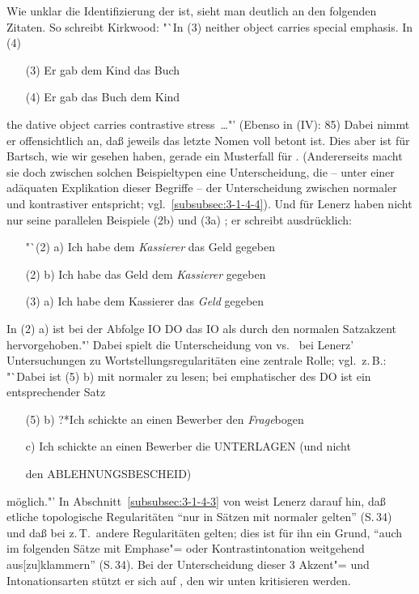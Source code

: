 \documentclass[output=paper]{langsci/langscibook}
\begin{document}
Wie unklar die Identifizierung der  ist, sieht
man deutlich an den folgenden Zitaten. So schreibt Kirkwood:
\ea \label{ex:3-4}
"`In (3) neither object carries special emphasis. In (4)
\begin{enumerate}
\setlength{\itemindent}{2em}
\item[(3)] Er gab dem Kind das Buch
\item[(4)] Er gab das Buch dem Kind
\end{enumerate}
the dative object carries contrastive stress\ \ldots{}"' \citep[86]{Kirkwood69}
\z
(Ebenso \zb in \citealt{Griesbach1961a} (IV): 85) Dabei nimmt er offensichtlich an, daß jeweils das letzte Nomen voll betont ist. Dies aber ist \zb für Bartsch, wie wir gesehen haben, gerade
ein Musterfall für . (Andererseits macht sie doch zwischen solchen Beispieltypen eine Unterscheidung, die -- unter einer adäquaten Explikation dieser Begriffe -- der Unterscheidung zwischen normaler und kontrastiver  entspricht; vgl.\ \ref{subsubsec:3-1-4-4}). Und für Lenerz haben nicht nur seine parallelen Beispiele (2b) und (3a) ; er schreibt
ausdrücklich:
\ea \label{ex:3-5}
\begin{enumerate}
\setlength{\itemindent}{2em}
\item["`{}(2) a)] Ich habe dem \textit{Kassierer} das Geld gegeben
\item[(2) b)] Ich habe das Geld dem \textit{Kassierer} gegeben
\item[(3) a)] Ich habe dem Kassierer das \textit{Geld} gegeben
\end{enumerate}
In (2) a) ist bei der Abfolge IO DO das IO als  durch den normalen Satzakzent hervorgehoben."' \citep[147 (43)]{Lenerz77}
\z
\addlines[2]
Dabei spielt die Unterscheidung von  vs.\
 bei Lenerz' Untersuchungen zu
Wortstellungsregularitäten eine zentrale Rolle; vgl.\ z.\,B.:
\ea
\label{ex:3-6}
"`Dabei ist (5) b) mit normaler  zu lesen; bei emphatischer
\isi{Betonung} des DO ist ein entsprechender Satz
\begin{enumerate}
	\setlength{\itemindent}{2em}
\item[(5) b)] ?*Ich schickte an einen Bewerber den \textit{Frage}bogen
\item[c)] Ich schickte an einen Bewerber die UNTERLAGEN (und nicht \\
\item [] den ABLEHNUNGSBESCHEID)
\end{enumerate}
möglich."' \citep[66f]{Lenerz77}
\z
In Abschnitt~\ref{subsubsec:3-1-4-3} von \citet{Lenerz77} weist Lenerz darauf hin, daß
etliche topologische Regularitäten "`nur in Sätzen mit normaler \isi{Intonation} gelten"' (S.\,34) und daß bei   z.\,T.\ andere Regularitäten gelten; dies ist für ihn ein Grund, "`auch im folgenden Sätze mit Emphase"= oder Kontrastintonation weitgehend aus[zu]klammern"' (S.\,34). Bei der Unterscheidung dieser 3 Akzent"= und Intonationsarten stützt er sich auf \citet{Bierwisch66}, den wir unten kritisieren werden.
\end{document}
